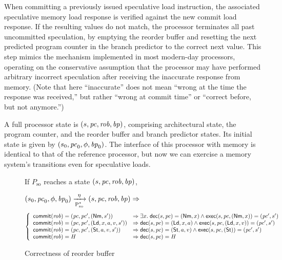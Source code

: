 When committing a
previously issued speculative load instruction, the associated speculative
memory load response is verified against the new commit load response. If the
resulting values do not match, the processor terminates all past uncommitted
speculation, by emptying the reorder buffer and resetting the
next predicted program counter in the branch predictor to the correct next value. This step mimics
the mechanism implemented in most modern-day processors, operating on the
conservative assumption that the processor may have performed arbitrary
incorrect speculation after receiving the inaccurate response from
memory.  (Note that here ``inaccurate'' does not mean ``wrong at
the time the response was received,'' but rather ``wrong at commit
time'' or ``correct before, but not anymore.'')

A full processor state is $(s, \pc, \rob, \ppc)$, comprising
architectural state, the program counter, and the reorder buffer and branch
predictor states. Its initial state is given by $(s_0, \pc_0, \phi, \ppc_0)$.
The interface of this processor with memory is identical
to that of the reference processor, but now we can exercise a memory
system's transitions even for speculative loads.

\begin{figure*}[t]
\small
\begin{inv}
If $P_\text{so}$ reaches a state $(s, \pc, \rob, \ppc)$, \ie{}

$\io{P$_\text{so}^{*}$}{s_0,\pc_0,\phi,\ppc_0}{s,\pc,\rob,\ppc}{\eta} \Rightarrow$
\begin{displaymath}
\left\{
\begin{array}{ll}
\commit(\rob) = (\pc, \pc', (\nm, s')) &\Rightarrow
\exists x. \; \dec(s,\pc) = (\nm, x) \wedge \exec(s,\pc, (\nm,x)) =
(\pc', s')\\
\commit(\rob) = (\pc, \pc', (\ld, x, a, v, s')) & \Rightarrow
\dec(s,\pc) = (\ld, x,a) \wedge \exec(s,\pc, (\ld,x,v)) = (\pc', s')\\
\commit(\rob) = (\pc, \pc', (\st, a, v, s')) &\Rightarrow
\dec(s,\pc) = (\st, a,v) \wedge \exec(s,\pc, (\st)) =
(\pc', s')\\
\commit(\rob) = H & \Rightarrow
\dec(s, \pc) = H\\
\end{array}
\right.\end{displaymath}
\label{rob}
\end{inv}
\vspace{-.5cm}
\caption{Correctness of reorder buffer}
\label{robfig}
\end{figure*}


